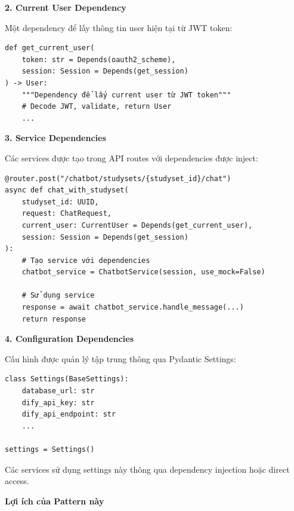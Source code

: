 \documentclass[../DoAn.tex]{subfiles}
\begin{document}
\textbf{2. Current User Dependency}

Một dependency để lấy thông tin user hiện tại từ JWT token:

\begin{verbatim}
def get_current_user(
    token: str = Depends(oauth2_scheme),
    session: Session = Depends(get_session)
) -> User:
    """Dependency để lấy current user từ JWT token"""
    # Decode JWT, validate, return User
    ...
\end{verbatim}

\textbf{3. Service Dependencies}

Các services được tạo trong API routes với dependencies được inject:

\begin{verbatim}
@router.post("/chatbot/studysets/{studyset_id}/chat")
async def chat_with_studyset(
    studyset_id: UUID,
    request: ChatRequest,
    current_user: CurrentUser = Depends(get_current_user),
    session: Session = Depends(get_session)
):
    # Tạo service với dependencies
    chatbot_service = ChatbotService(session, use_mock=False)
    
    # Sử dụng service
    response = await chatbot_service.handle_message(...)
    return response
\end{verbatim}

\textbf{4. Configuration Dependencies}

Cấu hình được quản lý tập trung thông qua Pydantic Settings:

\begin{verbatim}
class Settings(BaseSettings):
    database_url: str
    dify_api_key: str
    dify_api_endpoint: str
    ...

settings = Settings()
\end{verbatim}

Các services sử dụng settings này thông qua dependency injection hoặc direct access.

\textbf{Lợi ích của Pattern này}
\end{document}
